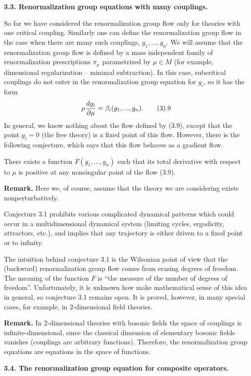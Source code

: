 {\bf 3.3. Renormalization group equations with many couplings.}

So far we have considered the renormalization group flow only for 
theories with one critical coupling. Similarly one can define 
the renormalization group flow in the case when there are many such couplings,
$g_1,...,g_n$. We will assume that the renormalization group flow
is defined by a mass independent family of renormalization prescriptions
$\pi_\mu$ parametrized by $\mu\in M$ (for example, dimensional regularization 
-- minimal subtraction). In this case, subcritical couplings 
do not enter in the renormalization group equation for $g_i$, so it has the 
form
$$
\mu\frac{d g_i}{\d \mu}=\beta_i(g_1,...,g_n).\tag 3.9
$$
In general, we know nothing about the flow defined by (3.9), except that 
the point $g_i=0$ (the free theory) is a fixed point of this flow. 
However, there is the following conjecture, which says that 
this flow behaves as a gradient flow. 

 There exists a function $F(g_1,...,g_n)$ such that
its total derivative with respect to $\mu$ is positive at any nonsingular 
point of the flow (3.9). 
\endproclaim

{\bf Remark.} Here we, of course, assume that the theory we are considering 
exists nonperturbatively. 

Conjecture 3.1 prohibits various complicated dynamical patterns which could 
occur in a multidimensional dynamical system (limiting cycles, 
ergodicity, attractors, etc.), and implies that any trajectory is 
either driven to a fixed point or to infinity. 

The intuition behind conjecture 3.1 is the Wilsonian point of view 
that the (backward) renormalization group flow comes from erasing 
degrees of freedom. The meaning of the function $F$ is ``the measure 
of the number of degrees of freedom''. Unfortunately, it is unknown 
how make mathematical sense of this idea in general, so conjecture 3.1 remains 
open. It is proved, however, in many special cases, 
for example, in 2-dimensional field theories. 

{\bf Remark.} In 2-dimensional theories with bosonic fields 
the space of couplings is infinite-dimensional, since the classical 
dimension of elementary bosonic fields vanishes
(couplings are arbitrary functions). Therefore, the renormalization group
equations are equations in the space of functions. 

{\bf 3.4. The renormalization group equation for composite operators.} 

